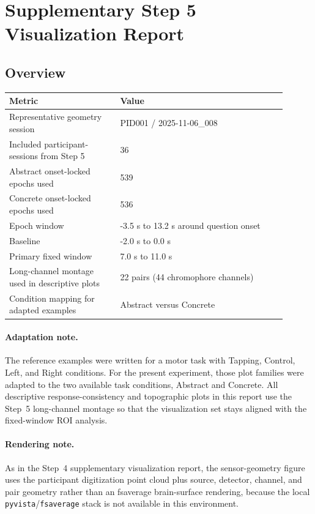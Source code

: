 \documentclass[11pt]{article}
\begin{document}
\section*{Supplementary Step 5 Visualization Report}
\subsection*{Overview}
\begin{tabular}{p{0.36\linewidth}p{0.54\linewidth}}
\toprule
Metric & Value\\
\midrule
Representative geometry session & PID001 / 2025-11-06\_008\\
Included participant-sessions from Step 5 & 36\\
Abstract onset-locked epochs used & 539\\
Concrete onset-locked epochs used & 536\\
Epoch window & -3.5 s to 13.2 s around question onset\\
Baseline & -2.0 s to 0.0 s\\
Primary fixed window & 7.0 s to 11.0 s\\
Long-channel montage used in descriptive plots & 22 pairs (44 chromophore channels)\\
Condition mapping for adapted examples & Abstract versus Concrete\\
\bottomrule
\end{tabular}
\paragraph{Adaptation note.} The reference examples were written for a motor task with Tapping, Control, Left, and Right conditions. For the present experiment, those plot families were adapted to the two available task conditions, Abstract and Concrete. All descriptive response-consistency and topographic plots in this report use the Step~5 long-channel montage so that the visualization set stays aligned with the fixed-window ROI analysis.
\paragraph{Rendering note.} As in the Step~4 supplementary visualization report, the sensor-geometry figure uses the participant digitization point cloud plus source, detector, channel, and pair geometry rather than an fsaverage brain-surface rendering, because the local \texttt{pyvista}/\texttt{fsaverage} stack is not available in this environment.
\end{document}
